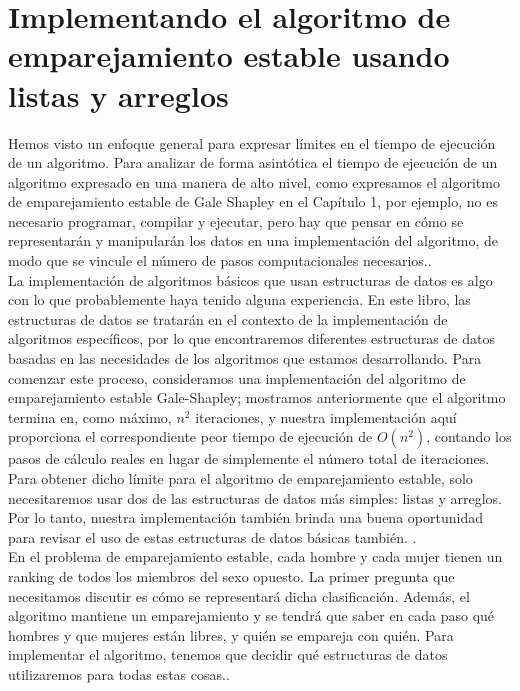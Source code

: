 \documentclass[a4paper, 12pt]{book}
\begin{document}
\section{Implementando el algoritmo de emparejamiento estable usando listas y arreglos}

Hemos visto un enfoque general para expresar límites en el tiempo de ejecución de un algoritmo. Para analizar de forma asintótica el tiempo de ejecución de un algoritmo expresado en una manera de alto nivel, como expresamos el algoritmo de emparejamiento estable de Gale Shapley en el Capítulo 1, por ejemplo, no es necesario programar, compilar y ejecutar, pero hay que pensar en cómo se representarán y manipularán los datos en una implementación del algoritmo, de modo que se vincule el número de pasos computacionales necesarios..\\

La implementación de algoritmos básicos que usan estructuras de datos es algo con lo que probablemente haya tenido alguna experiencia. En este libro, las estructuras de datos se tratarán en el contexto de la implementación de algoritmos específicos, por lo que encontraremos diferentes estructuras de datos basadas en las necesidades de los algoritmos que estamos desarrollando. Para comenzar este proceso,
consideramos una implementación del algoritmo de emparejamiento estable Gale-Shapley;
mostramos anteriormente que el algoritmo termina en, como máximo, $n^2$ iteraciones, y nuestra
implementación aquí proporciona el correspondiente peor tiempo de ejecución de $O (n^2)$, contando los pasos de cálculo reales en lugar de simplemente el número total de iteraciones. Para obtener dicho límite para el algoritmo de emparejamiento estable, solo necesitaremos usar dos de las estructuras de datos más simples: listas y arreglos. Por lo tanto, nuestra implementación también brinda una buena oportunidad para revisar el uso de estas estructuras de datos básicas también. .\\

En el problema de emparejamiento estable, cada hombre y cada mujer tienen un ranking de todos los miembros del sexo opuesto. La primer pregunta que necesitamos discutir es cómo se representará dicha clasificación. Además, el algoritmo mantiene un emparejamiento y se tendrá que saber en cada paso qué hombres y que mujeres están libres, y quién se empareja con quién. Para implementar el algoritmo, tenemos que decidir qué estructuras de datos utilizaremos para todas estas cosas..\\
\end{document}
